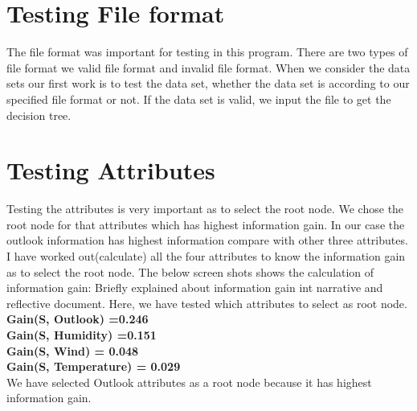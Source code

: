 \documentclass{article}
\begin{document}
\section{Testing File format }

The file format was important for testing in this program. There are two types of file format we valid file format and invalid file format. 
When we consider the data sets our first work is to test the data set, whether the data set is according to our specified file format or not. If the data set is valid, we input the file to get the decision tree.  
\section{Testing Attributes}

Testing the attributes is very important as to select the root node. We chose the root node for that attributes which has highest information gain. In our case the outlook information has highest information compare with other three attributes. I have worked out(calculate) all the four attributes to know the information gain as to select the root node.
The below screen shots shows the calculation of information gain: Briefly explained about information gain int narrative and reflective document. Here, we have tested which attributes to select as root node.
{\bf Gain(S, Outlook) =0.246}\\
{\bf Gain(S, Humidity) =0.151}\\
{\bf Gain(S, Wind) = 0.048}\\
{\bf Gain(S, Temperature) = 0.029}\\
We have selected Outlook attributes as a root node because it has highest information gain. 
\end{document}
